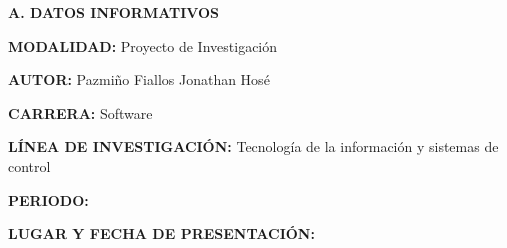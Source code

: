 


\setcounter{page}{2}

\tableofcontents
\pagebreak

\listoftables
\pagebreak

\begin{center}
	\textbf{A. DATOS INFORMATIVOS}
\end{center}\par
\textbf{MODALIDAD: } Proyecto de Investigación\par
\textbf{AUTOR: } Pazmiño Fiallos Jonathan Hosé\par
\textbf{CARRERA: } Software\par
\textbf{LÍNEA DE INVESTIGACIÓN: } Tecnología de la información y sistemas de control\par
\textbf{PERIODO: } \periodo\par
\textbf{LUGAR Y FECHA DE PRESENTACIÓN: } %
\pagebreak
